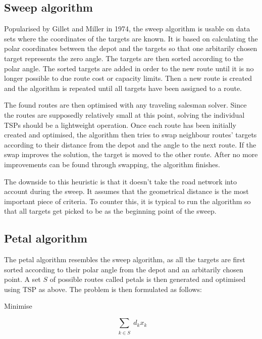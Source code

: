 \subsection{Sweep algorithm}			

Popularised by Gillet and Miller in 1974, the sweep algorithm is usable on data sets where the coordinates of the targets are known. It is based on calculating the polar coordinates between the depot and the targets so that one arbitarily chosen target represents the zero angle. The targets are then sorted according to the polar angle. The sorted targets are added in order to the new route until it is no longer possible to due route cost or capacity limits. Then a new route is created and the algorithm is repeated until all targets have been assigned to a route. \cite{gillett1974heuristic}

The found routes are then optimised with any traveling salesman solver. Since the routes are supposedly relatively small at this point, solving the individual TSPs should be a lightweight operation. Once each route has been initially created and optimised, the algorithm then tries to swap neighbour routes' targets according to their distance from the depot and the angle to the next route. If the swap improves the solution, the target is moved to the other route. After no more improvements can be found through swapping, the algorithm finishes. \cite{gillett1974heuristic}

The downside to this heuristic is that it doesn't take the road network into account during the sweep. It assumes that the geometrical distance is the most important piece of criteria. To counter this, it is typical to run the algorithm so that all targets get picked to be as the beginning point of the sweep. \cite{reimann2004d} 



\subsection{Petal algorithm}

The petal algorithm resembles the sweep algorithm, as all the targets are first sorted according to their polar angle from the depot and an arbitarily chosen point. A set $S$ of possible routes called petals is then generated and optimised using TSP as above. The problem is then formulated as follows:


\bigskip
\noindent
Minimise

\begin{equation}
\label{eq:petal1}
\displaystyle\sum_{\substack{k \in S}} d_kx_k
\end{equation}


